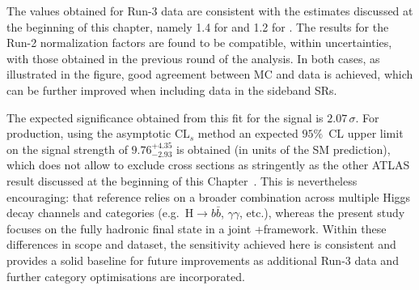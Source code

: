 The values obtained for Run-3 data are consistent with the estimates discussed at the beginning of this chapter, namely 1.4 for \ztautau and 1.2 for \ttbar. The results for the Run-2 normalization factors are found to be compatible, within uncertainties, with those obtained in the previous round of the analysis. In both cases, as illustrated in the figure, good agreement between MC and data is achieved, which can be further improved when including data in the sideband SRs.

The expected significance obtained from this fit for the \ttHtt signal is $2.07\,\sigma$. For \thqb production, using the asymptotic $\mathrm{CL}_{s}$ method an expected $95\%$~CL upper limit on the signal strength of $9.76^{+4.35}_{-2.93}$ is obtained (in units of the SM prediction), which does not allow to exclude cross sections as stringently as the other ATLAS result discussed at the beginning of this Chapter~\cite{ATLAS:2025irr}. This is nevertheless encouraging: that reference relies on a broader combination across multiple Higgs decay channels and categories (e.g.\ $\mathrm{H}\!\to\! b\bar b$, $\gamma\gamma$, etc.), whereas the present study focuses on the \htautau fully hadronic final state in a joint \ttH+\thqb framework. Within these differences in scope and dataset, the sensitivity achieved here is consistent and provides a solid baseline for future improvements as additional Run-3 data and further category optimisations are incorporated.










